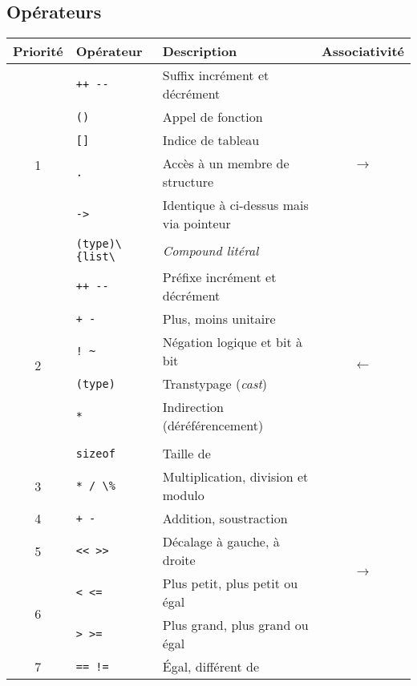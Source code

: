\documentclass{article}
\newcommand{\cd}{\lstinline}
\begin{document}
\begin{multicols*}{3}
\section*{Opérateurs}

\begin{tabularx}{\linewidth}{c|l|X|c}
  \bf Priorité & \bf Opérateur & \bf Description & \bf Associativité \\
  \hline
  \multirow{6}{*}{1} & \cd{++ --}  & Suffix incrément et décrément & \multirow{6}{*}{$\rightarrow$} \\
                     & \cd{()}     & Appel de fonction                     & \\
                     & \cd{[]}     & Indice de tableau                     & \\
                     & \cd{.}      & Accès à un membre de structure        & \\
                     & \cd{->}     & Identique à ci-dessus mais via pointeur & \\
                     & \cd{(type)\{list\}} & \emph{Compound litéral} & \\
  \hline
  \multirow{7}{*}{2} & \cd{++ --}  & Préfixe incrément et décrément & \multirow{7}{*}{$\leftarrow$} \\
                     & \cd{+ -}    & Plus, moins unitaire & \\
                     & \cd{! ~}    & Négation logique et bit à bit & \\
                     & \cd{(type)} & Transtypage (\emph{cast}) & \\
                     & \cd{*}      & Indirection (déréférencement) & \\
                     & \cd{&}      & Adresse de & \\
                     & \cd{sizeof} & Taille de & \\
  \hline
  3                  & \cd{* / \%}  & Multiplication, division et modulo & \multirow{11}{*}{$\rightarrow$} \\
  \cline{1-3}
  4                  & \cd{+ -}    & Addition, soustraction & \\
  \cline{1-3}
  5                  & \cd{<< >>}  & Décalage à gauche, à droite & \\
  \cline{1-3}
  \multirow{2}{*}{6}  & \cd{< <=}   & Plus petit, plus petit ou égal & \\
                     & \cd{> >=}   & Plus grand, plus grand ou égal & \\
  \cline{1-3}
  7                  & \cd{== !=}  & Égal, différent de & \\

\end{tabularx}
\end{multicols*}
\end{document}
